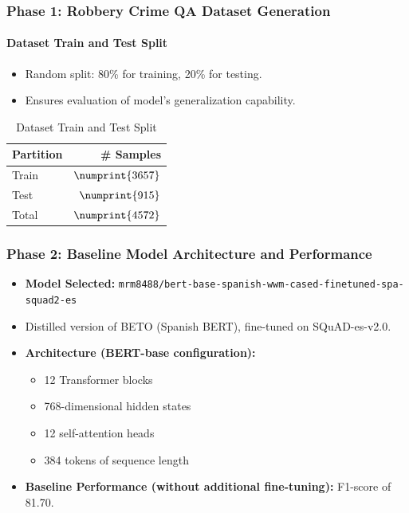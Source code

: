 \documentclass{beamer}
\begin{document}
\begin{frame}
    \frametitle{Phase 1: Robbery Crime \ac{QA} Dataset Generation}
    \framesubtitle{Dataset Train and Test Split}
    \begin{itemize}
        \item Random split: 80\% for training, 20\% for testing.
        \item Ensures evaluation of model's generalization capability.
    \end{itemize}
    \begin{table}[htbp]
    \caption{Dataset Train and Test Split}
    \centering
    \small
    \begin{tabular}{lr}
      \toprule
    Partition & \# Samples\\
    \midrule
    Train & $\numprint{3657}$\\
      Test & $\numprint{915}$\\
      \midrule
      Total & $\numprint{4572}$\\
      \bottomrule
    \end{tabular}
    \end{table}
\end{frame}

\begin{frame}
    \frametitle{Phase 2: Baseline Model Architecture and Performance}
    \begin{itemize}
        \item \textbf{Model Selected:} \texttt{mrm8488/bert-base-spanish-wwm-cased-finetuned-spa-squad2-es}
        \item Distilled version of BETO (Spanish BERT), fine-tuned on SQuAD-es-v2.0.
        \item \textbf{Architecture (BERT-base configuration):}
        \begin{itemize}
            \item 12 Transformer blocks
            \item 768-dimensional hidden states
            \item 12 self-attention heads
            \item 384 tokens of sequence length
        \end{itemize}
        \item \textbf{Baseline Performance (without additional fine-tuning):} F1-score of 81.70.
    \end{itemize}
\end{frame}
\end{document}
